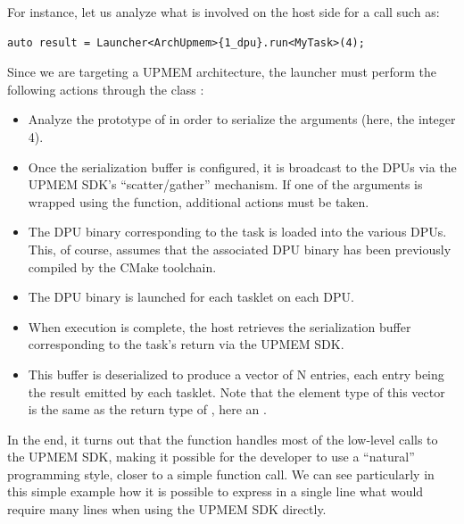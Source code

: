 For instance, let us analyze what is involved on the host side for a call such as:

\begin{verbatim}
auto result = Launcher<ArchUpmem>{1_dpu}.run<MyTask>(4);
\end{verbatim}

Since we are targeting a UPMEM architecture, the launcher must perform the following actions through the class :

\begin{itemize}

\item Analyze the prototype of  in order to serialize the arguments (here, the integer 4).

\item Once the serialization buffer is configured, it is broadcast to the DPUs via the UPMEM SDK’s “scatter/gather” mechanism. If one of the arguments is wrapped using the  function, additional actions must be taken.

\item The DPU binary corresponding to the task is loaded into the various DPUs. This, of course, assumes that the associated DPU binary has been previously compiled by the CMake toolchain.

\item The DPU binary is launched for each tasklet on each DPU.

\item When execution is complete, the host retrieves the serialization buffer corresponding to the task’s return via the UPMEM SDK.

\item This buffer is deserialized to produce a vector of N entries, each entry being the result emitted by each tasklet. Note that the element type of this  vector is the same as the return type of , here an .

\end{itemize}
 
In the end, it turns out that the  function handles most of the low-level calls to the UPMEM SDK, making it possible for the developer to use a “natural” programming style, closer to a simple function call. We can see particularly in this simple example how it is possible to express in a single line what would require many lines when using the UPMEM SDK directly.

